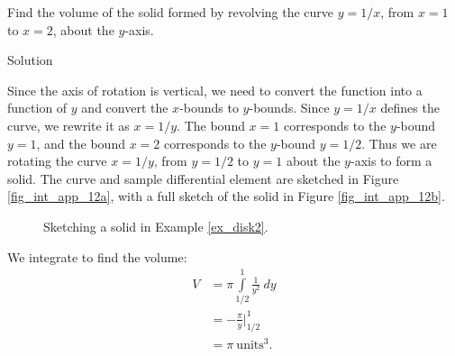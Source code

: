 \begin{example}\label{ex_disk2}
Find the volume of the solid formed by revolving the curve $y=1/x$, from $x=1$ to $x=2$, about the $y$-axis.

Solution 

Since the axis of rotation is vertical, we need to convert the function into a function of $y$ and convert the $x$-bounds to $y$-bounds. Since $y=1/x$ defines the curve, we rewrite it as $x=1/y$. The bound $x=1$ corresponds to the $y$-bound $y=1$, and the bound $x=2$ corresponds to the $y$-bound $y=1/2$. 
Thus we are rotating the curve $x=1/y$, from $y=1/2$ to $y=1$ about the $y$-axis to form a solid. The curve and sample differential element are sketched in Figure \ref{fig_int_app_12a}, with a full sketch of the solid in Figure \ref{fig_int_app_12b}.


\begin{figure}[H]
\centering
\qquad
{}
\caption{Sketching a solid in Example \ref{ex_disk2}.}
\end{figure}



We integrate to find the volume:
\begin{align*}
V &= \pi\int\limits_{1/2}^1 \frac{1}{y^2}\ dy \\[0.2cm]
	&= -\frac{\pi}y\Big|_{1/2}^1 \\[0.2cm]
	&= \pi\ \text{units}^3.
\end{align*}



\end{example}


